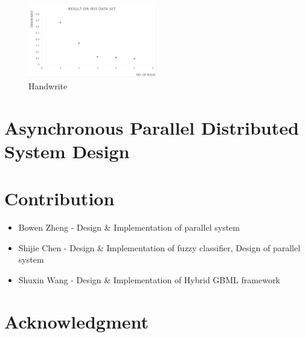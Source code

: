 \documentclass[conference]{IEEEtran}
\begin{document}
 \begin{figure}[H]
 	\centering
 	\includegraphics[width=0.5\textwidth]{iris.png}
 	\caption{Handwrite}\label{fig:digit}
 \end{figure}
  \section{Asynchronous Parallel Distributed System Design}


  \section{Contribution}
    \begin{itemize}
    \item Bowen Zheng - Design \& Implementation of parallel system
    \item Shijie Chen - Design \& Implementation of fuzzy classifier, Design of parallel system
    \item Shuxin Wang - Design \& Implementation of Hybrid GBML framework
    \end{itemize}
    

  \section*{Acknowledgment}




\end{document}
